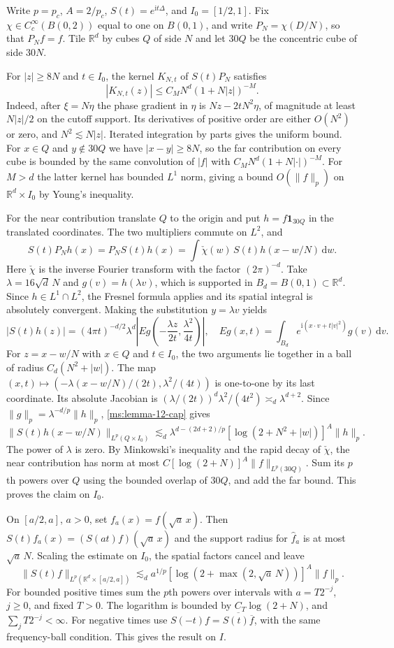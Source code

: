 Write $p=p_c$, $A=2/p_c$, $S(t)=e^{\mathrm it\Delta}$, and $I_0=[1/2,1]$. Fix $\chi\in C_c^\infty(B(0,2))$ equal to one on $B(0,1)$, and write $P_N=\chi(D/N)$, so that $P_Nf=f$. Tile $\mathbb R^d$ by cubes $Q$ of side $N$ and let $30Q$ be the concentric cube of side $30N$.

For $|z|\geq8N$ and $t\in I_0$, the kernel $K_{N,t}$ of $S(t)P_N$ satisfies
\[
|K_{N,t}(z)|\leq C_M N^d(1+N|z|)^{-M}.
\]
Indeed, after $\xi=N\eta$ the phase gradient in $\eta$ is $Nz-2tN^2\eta$, of magnitude at least $N|z|/2$ on the cutoff support. Its derivatives of positive order are either $O(N^2)$ or zero, and $N^2\lesssim N|z|$. Iterated integration by parts gives the uniform bound. For $x\in Q$ and $y\notin30Q$ we have $|x-y|\geq8N$, so the far contribution on every cube is bounded by the same convolution of $|f|$ with $C_M N^d(1+N|\cdot|)^{-M}$. For $M>d$ the latter kernel has bounded $L^1$ norm, giving a bound $O(\|f\|_p)$ on $\mathbb R^d\times I_0$ by Young's inequality.

For the near contribution translate $Q$ to the origin and put $h=f\mathbf 1_{30Q}$ in the translated coordinates. The two multipliers commute on $L^2$, and
\[
S(t)P_Nh(x)=P_NS(t)h(x)
 =\int\check\chi(w)\,S(t)h(x-w/N)\,\mathrm dw.
\]
Here $\check\chi$ is the inverse Fourier transform with the factor $(2\pi)^{-d}$. Take $\lambda=16\sqrt d\,N$ and $g(v)=h(\lambda v)$, which is supported in $B_d=B(0,1)\subset\mathbb R^d$. Since $h\in L^1\cap L^2$, the Fresnel formula applies and its spatial integral is absolutely convergent. Making the substitution $y=\lambda v$ yields
\[
|S(t)h(z)|=(4\pi t)^{-d/2}\lambda^d
 \left|Eg\!\left(-\frac{\lambda z}{2t},\frac{\lambda^2}{4t}\right)\right|,
\quad
Eg(x,t)=\int_{B_d}e^{\mathrm i(x\cdot v+t|v|^2)}g(v)\,\mathrm dv.
\]
For $z=x-w/N$ with $x\in Q$ and $t\in I_0$, the two arguments lie together in a ball of radius $C_d(N^2+|w|)$. The map $(x,t)\mapsto(-\lambda(x-w/N)/(2t),\lambda^2/(4t))$ is one-to-one by its last coordinate. Its absolute Jacobian is $(\lambda/(2t))^d\lambda^2/(4t^2)\asymp_d\lambda^{d+2}$. Since $\|g\|_p=\lambda^{-d/p}\|h\|_p$, \ref{ms:lemma-12-cap} gives
\[
\|S(t)h(x-w/N)\|_{L^p(Q\times I_0)}
 \lesssim_d \lambda^{d-(2d+2)/p}[\log(2+N^2+|w|)]^A\|h\|_p.
\]
The power of $\lambda$ is zero. By Minkowski's inequality and the rapid decay of $\check\chi$, the near contribution has norm at most $C[\log(2+N)]^A\|f\|_{L^p(30Q)}$. Sum its $p$th powers over $Q$ using the bounded overlap of $30Q$, and add the far bound. This proves the claim on $I_0$.

On $[a/2,a]$, $a>0$, set $f_a(x)=f(\sqrt a\,x)$. Then $S(t)f_a(x)=(S(at)f)(\sqrt a\,x)$ and the support radius for $\widehat f_a$ is at most $\sqrt a\,N$. Scaling the estimate on $I_0$, the spatial factors cancel and leave
\[
\|S(t)f\|_{L^p(\mathbb R^d\times[a/2,a])}
 \lesssim_d a^{1/p}[\log(2+\max(2,\sqrt a\,N))]^A\|f\|_p.
\]
For bounded positive times sum the $p$th powers over intervals with $a=T2^{-j}$, $j\geq0$, and fixed $T>0$. The logarithm is bounded by $C_T\log(2+N)$, and $\sum_j T2^{-j}<\infty$. For negative times use $S(-t)f=\overline{S(t)\overline f}$, with the same frequency-ball condition. This gives the result on $I$.
